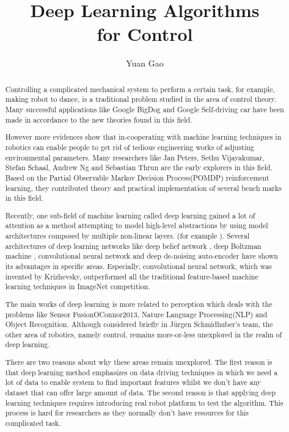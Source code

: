\documentclass[officiallayout]{tktla}
\title{Deep Learning Algorithms \\ for Control}
\author{Yuan Gao}
\begin{document}
\frontmatter

\maketitle
\listoftodos
\begin{abstract}
Controlling a complicated mechanical system to perform a certain task, for example, making robot to dance, is a traditional problem studied in the area of control theory. Many successful applications like Google BigDog\cite{Raibert2008} and Google Self-driving car  have been made in accordance to the new theories found in this field.

However more evidences show that in-cooperating with machine learning techniques in robotics can enable people to get rid of tedious engineering works of adjusting environmental parameters. Many researchers like Jan Peters, Sethu Vijayakumar, Stefan Schaal, Andrew Ng and Sebastian Thrun are the early explorers in this field. Based on the Partial Observable Markov Decision Process(POMDP) reinforcement learning, they contributed theory and practical implementation of several bench marks in this field.

Recently, one sub-field of machine learning called deep learning gained a lot of attention as a method attempting to model high-level abstractions by using model architectures composed by multiple non-linear layers. (for example \cite{Krizhevsky2012}). Several architectures of deep learning networks like deep belief network \cite{Hinton2006}, deep Boltzman machine \cite{Salakhutdinov2009}, convolutional neural network \cite{Krizhevsky2012} and deep de-noising auto-encoder \cite{Vincent2010} have shown its advantages in specific areas. Especially, convolutional neural network, which was invented by Krizhevsky, outperformed all the traditional feature-based machine learning techniques in ImageNet competition.

The main works of deep learning is more related to perception which deals with the problems like Sensor Fusion{OConnor2013}, Nature Language Processing(NLP)\cite{Cho2014} and Object Recognition\cite{Lenz2013}\cite{Hoffman2014}. Although considered briefly in J{\"u}rgen Schmidhuber's team\cite{Mayer2006}, the other area of robotics, namely control, remains more-or-less unexplored in the realm of deep learning.

There are two reasons about why these areas remain unexplored. The first reason is that deep learning method emphasizes on data driving techniques in which we need a lot of data to enable system to find important features whilst we don't have any dataset that can offer large amount of data. The second reason is that applying deep learning techniques requires introducing real robot platform to test the algorithm. This process is hard for researchers as they normally don't have resources for this complicated task.


\end{abstract}
\end{document}
